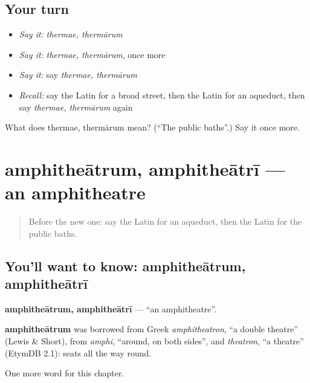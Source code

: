 \subsection*{Your turn}
\begin{itemize}
\raggedright
  \item \emph{Say it:} \emph{thermae, thermārum}
  \item \emph{Say it:} \emph{thermae, thermārum}, once more
  \item \emph{Say it:} say \emph{thermae, thermārum}
  \item \emph{Recall:} say the Latin for a broad street, then the Latin for an aqueduct, then say \emph{thermae, thermārum} again
\end{itemize}

\begin{tcolorbox}[breakable,colback=teal!4,colframe=teal!35!black,title={Before you move on}]
What does thermae, thermārum mean? (\textquotedblleft{}The public baths\textquotedblright{}.) Say it once more.
\end{tcolorbox}
\section[amphitheātrum, amphitheātrī]{amphitheātrum, amphitheātrī — an amphitheatre}

\label{lesson:LA-C244-amphitheatrum}



\begin{quote}
Before the new one: say the Latin for an aqueduct, then the Latin for the public baths.
\end{quote}

\subsection*{You'll want to know: amphitheātrum, amphitheātrī}
\textbf{amphitheātrum, amphitheātrī} — \textquotedblleft{}an amphitheatre\textquotedblright{}.

\begin{cousinweb}
\textbf{amphitheātrum} was borrowed from Greek \emph{amphitheatron}, \textquotedblleft{}a double theatre\textquotedblright{} (Lewis \& Short), from \emph{amphi}, \textquotedblleft{}around, on both sides\textquotedblright{}, and \emph{theatron}, \textquotedblleft{}a theatre\textquotedblright{} (EtymDB 2.1): seats all the way round.
\end{cousinweb}

\begin{grammarlens}[title={What you've built}]
One more word for this chapter.
\end{grammarlens}

